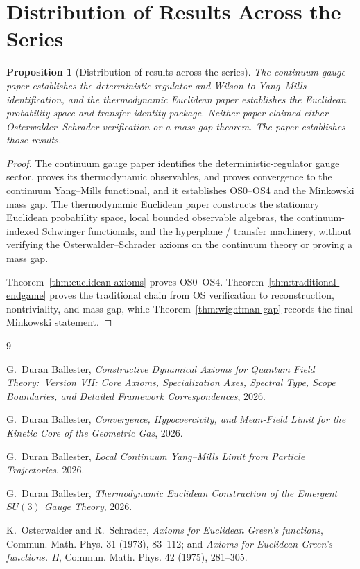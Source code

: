 \documentclass[11pt]{article}
\newtheorem{proposition}[theorem]{Proposition}
\theoremstyle{definition}
\theoremstyle{remark}
\begin{document}
\appendix

\section{Distribution of Results Across the Series}
\label{sec:appendix-paper4}

\begin{proposition}[Distribution of results across the series]
\label{prop:paper4-discharged}
The continuum gauge paper establishes the deterministic regulator and Wilson-to-Yang--Mills identification, and the thermodynamic Euclidean paper establishes the Euclidean probability-space and transfer-identity package.
Neither paper claimed either
Osterwalder--Schrader verification or a mass-gap theorem.  The paper
establishes those results.
\end{proposition}

\begin{proof}
The continuum gauge paper identifies the deterministic-regulator gauge sector,
proves its thermodynamic observables, and proves convergence to the continuum
Yang--Mills functional, and it establishes OS0--OS4 and the Minkowski
mass gap.  The thermodynamic Euclidean paper constructs the stationary
Euclidean probability space, local bounded observable algebras, the
continuum-indexed Schwinger functionals, and the hyperplane / transfer
machinery, without verifying the Osterwalder--Schrader axioms on the
continuum theory or proving a mass gap.

Theorem~\ref{thm:euclidean-axioms} proves OS0--OS4.
Theorem~\ref{thm:traditional-endgame} proves the traditional chain from OS
verification to reconstruction, nontriviality, and mass gap, while
Theorem~\ref{thm:wightman-gap} records the final Minkowski statement.
\end{proof}

\begin{thebibliography}{9}

G.~Duran Ballester,
\emph{Constructive Dynamical Axioms for Quantum Field Theory:\ Version VII:
Core Axioms, Specialization Axes, Spectral Type, Scope Boundaries, and Detailed
Framework Correspondences}, 2026.

G.~Duran Ballester,
\emph{Convergence, Hypocoercivity, and Mean-Field Limit for the Kinetic Core of
the Geometric Gas}, 2026.

G.~Duran Ballester,
\emph{Local Continuum Yang--Mills Limit from Particle Trajectories}, 2026.

G.~Duran Ballester,
\emph{Thermodynamic Euclidean Construction of the Emergent $SU(3)$ Gauge
Theory}, 2026.

K.~Osterwalder and R.~Schrader,
\emph{Axioms for Euclidean Green's functions}, Commun. Math. Phys. 31 (1973),
83--112; and \emph{Axioms for Euclidean Green's functions. II}, Commun. Math.
Phys. 42 (1975), 281--305.

\end{thebibliography}
\end{document}

